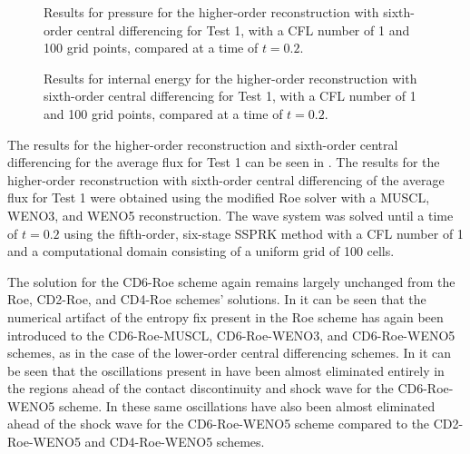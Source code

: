 \begin{figure}
	\caption[Results for pressure for the higher-order reconstruction with sixth-order central differencing for Test 1, with a CFL number of 1 and 100 grid points, compared at a time of $t=0.2$.]{Results for pressure for the higher-order reconstruction with sixth-order central differencing for Test 1, with a CFL number of 1 and 100 grid points, compared at a time of $t=0.2$.}
	\label{fig:Test1HORCD6pressure}
\end{figure}

\begin{figure}
	\caption[Results for internal energy for the higher-order reconstruction with sixth-order central differencing for Test 1, with a CFL number of 1 and 100 grid points, compared at a time of $t=0.2$.]{Results for internal energy for the higher-order reconstruction with sixth-order central differencing for Test 1, with a CFL number of 1 and 100 grid points, compared at a time of $t=0.2$.}
	\label{fig:Test1HORCD6energy}
\end{figure}
The results for the higher-order reconstruction and sixth-order central differencing for the average flux for Test 1 can be seen in . The results for the higher-order reconstruction with sixth-order central differencing of the average flux for Test 1 were obtained using the modified Roe solver with a MUSCL, WENO3, and WENO5 reconstruction. The wave system was solved until a time of $t=0.2$ using the fifth-order, six-stage SSPRK method with a CFL number of 1 and a computational domain consisting of a uniform grid of 100 cells.

The solution for the CD6-Roe scheme again remains largely unchanged from the Roe, CD2-Roe, and CD4-Roe schemes' solutions. In  it can be seen that the numerical artifact of the entropy fix present in the Roe scheme has again been introduced to the CD6-Roe-MUSCL, CD6-Roe-WENO3, and CD6-Roe-WENO5 schemes, as in the case of the lower-order central differencing schemes. In  it can be seen that the oscillations present in  have been almost eliminated entirely in the regions ahead of the contact discontinuity and shock wave for the CD6-Roe-WENO5 scheme. In  these same oscillations have also been almost eliminated ahead of the shock wave for the CD6-Roe-WENO5 scheme compared to the CD2-Roe-WENO5 and CD4-Roe-WENO5 schemes.

